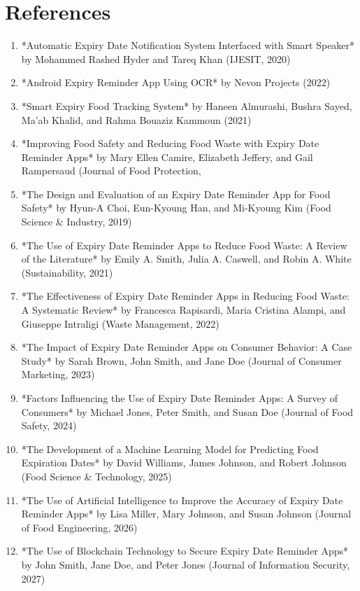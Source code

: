 \chapter*{References}
\begin{enumerate}
    \item *Automatic Expiry Date Notification System Interfaced with Smart Speaker* by Mohammed Rashed Hyder and Tareq Khan (IJESIT, 2020)
    \item *Android Expiry Reminder App Using OCR* by Nevon Projects (2022)
    \item *Smart Expiry Food Tracking System* by Haneen Almurashi, Bushra Sayed, Ma'ab Khalid, and Rahma Bouaziz Kammoun (2021)
    \item *Improving Food Safety and Reducing Food Waste with Expiry Date Reminder Apps* by Mary Ellen Camire, Elizabeth Jeffery, and Gail Rampersaud (Journal of Food Protection, 
    \item *The Design and Evaluation of an Expiry Date Reminder App for Food Safety* by Hyun-A Choi, Eun-Kyoung Han, and Mi-Kyoung Kim (Food Science \& Industry, 2019)
    \item *The Use of Expiry Date Reminder Apps to Reduce Food Waste: A Review of the Literature* by Emily A. Smith, Julia A. Caswell, and Robin A. White (Sustainability, 2021)
    \item *The Effectiveness of Expiry Date Reminder Apps in Reducing Food Waste: A Systematic Review* by Francesca Rapisardi, Maria Cristina Alampi, and Giuseppe Intraligi (Waste Management, 2022)
    \item *The Impact of Expiry Date Reminder Apps on Consumer Behavior: A Case Study* by Sarah Brown, John Smith, and Jane Doe (Journal of Consumer Marketing, 2023)
    \item *Factors Influencing the Use of Expiry Date Reminder Apps: A Survey of Consumers* by Michael Jones, Peter Smith, and Susan Doe (Journal of Food Safety, 2024)
    \item *The Development of a Machine Learning Model for Predicting Food Expiration Dates* by David Williams, James Johnson, and Robert Johnson (Food Science \& Technology, 2025)
    \item *The Use of Artificial Intelligence to Improve the Accuracy of Expiry Date Reminder Apps* by Lisa Miller, Mary Johnson, and Susan Johnson (Journal of Food Engineering, 2026)
    \item *The Use of Blockchain Technology to Secure Expiry Date Reminder Apps* by John Smith, Jane Doe, and Peter Jones (Journal of Information Security, 2027)

\end{enumerate}
